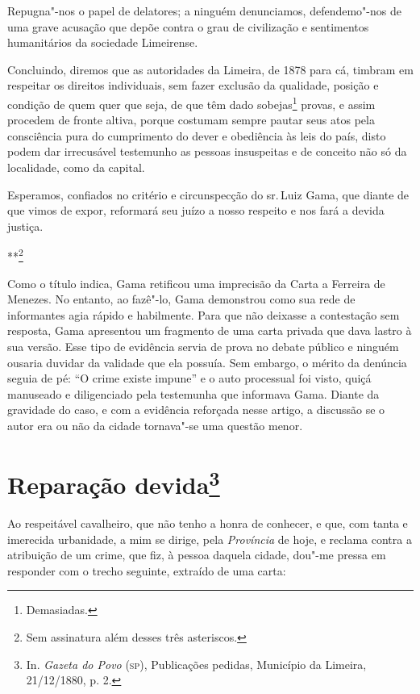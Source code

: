 Repugna"-nos o papel de delatores; a ninguém denunciamos, defendemo"-nos
de uma grave acusação que depõe contra o grau de civilização e
sentimentos humanitários da sociedade Limeirense.

Concluindo, diremos que as autoridades da Limeira, de 1878 para cá,
timbram em respeitar os direitos individuais, sem fazer exclusão da
qualidade, posição e condição de quem quer que seja, de que têm dado
sobejas\footnote{Demasiadas.} provas, e assim procedem de fronte
altiva, porque costumam sempre pautar seus atos pela consciência pura do
cumprimento do dever e obediência às leis do país, disto podem dar
irrecusável testemunho as pessoas insuspeitas e de conceito não só da
localidade, como da capital.

Esperamos, confiados no critério e circunspecção do sr.\,Luiz Gama, que
diante de que vimos de expor, reformará seu juízo a nosso respeito e nos
fará a devida justiça.

\bigskip

\hfill***\footnote{Sem assinatura além desses três asteriscos.}

\paginabranca
\mbox{}\vfill
\thispagestyle{empty}

{\small\noindent
Como o título indica, Gama retificou uma imprecisão da Carta a
Ferreira de Menezes. No entanto, ao fazê"-lo, Gama demonstrou como sua
rede de informantes agia rápido e habilmente. Para que não deixasse a
contestação sem resposta, Gama apresentou um fragmento de uma carta
privada que dava lastro à sua versão. Esse tipo de evidência servia de
prova no debate público e ninguém ousaria duvidar da validade que ela
possuía. Sem embargo, o mérito da denúncia seguia de pé: ``O crime existe
impune'' e o auto processual foi visto, quiçá manuseado e diligenciado
pela testemunha que informava Gama. Diante da gravidade do caso, e com a
evidência reforçada nesse artigo, a discussão se o autor era ou não da
cidade tornava"-se uma questão menor. }

\chapter{Reparação devida\footnote[*]{In. \emph{Gazeta do Povo} (\textsc{sp}),
  Publicações pedidas, Município da Limeira, 21/12/1880, p. 2.}}


Ao respeitável cavalheiro, que não tenho a honra de conhecer, e que, com
tanta e imerecida urbanidade, a mim se dirige, pela \emph{Província} de
hoje, e reclama contra a atribuição de um crime, que fiz, à pessoa
daquela cidade, dou"-me pressa em responder com o trecho seguinte,
extraído de uma carta:

